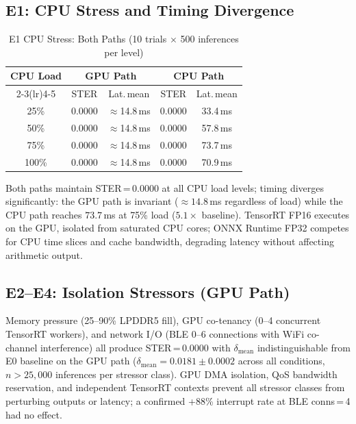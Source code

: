 \documentclass[journal,10pt,twocolumn]{IEEEtran}
\begin{document}
\subsection{E1: CPU Stress and Timing Divergence}

\begin{table}[!t]
\caption{E1 CPU Stress: Both Paths (10 trials $\times$ 500 inferences per level)}
\label{tab:e1}
\centering
\small
\begin{tabular}{ccccc}
\toprule
\multirow{2}{*}{\textbf{CPU Load}}
  & \multicolumn{2}{c}{\textbf{GPU Path}}
  & \multicolumn{2}{c}{\textbf{CPU Path}} \\
\cmidrule(lr){2-3}\cmidrule(lr){4-5}
  & STER & Lat.\,mean & STER & Lat.\,mean \\
\midrule
25\%  & 0.0000 & ${\approx}$14.8\,ms & 0.0000 & 33.4\,ms \\
50\%  & 0.0000 & ${\approx}$14.8\,ms & 0.0000 & 57.8\,ms \\
75\%  & 0.0000 & ${\approx}$14.8\,ms & 0.0000 & 73.7\,ms \\
100\% & 0.0000 & ${\approx}$14.8\,ms & 0.0000 & 70.9\,ms \\
\bottomrule
\end{tabular}
\end{table}

Both paths maintain STER\,=\,0.0000 at all CPU load levels;
timing diverges significantly: the GPU path is invariant
(${\approx}14.8$\,ms regardless of load) while the CPU path
reaches $73.7$\,ms at 75\% load ($5.1{\times}$ baseline).
TensorRT FP16 executes on the GPU, isolated from saturated CPU cores;
ONNX Runtime FP32 competes for CPU time slices and cache bandwidth,
degrading latency without affecting arithmetic output.

\subsection{E2--E4: Isolation Stressors (GPU Path)}

Memory pressure (25--90\% LPDDR5 fill), GPU co-tenancy (0--4
concurrent TensorRT workers), and network I/O (BLE 0--6 connections
with WiFi co-channel interference) all produce STER\,=\,0.0000 with
$\delta_\text{mean}$ indistinguishable from E0 baseline on the GPU path
($\delta_\text{mean}{=}0.0181\pm0.0002$ across all conditions, $n{>}25{,}000$
inferences per stressor class).
GPU DMA isolation, QoS bandwidth reservation, and independent TensorRT
contexts prevent all stressor classes from perturbing outputs or latency;
a confirmed +88\% interrupt rate at BLE conns\,=\,4 had no effect.
\end{document}
